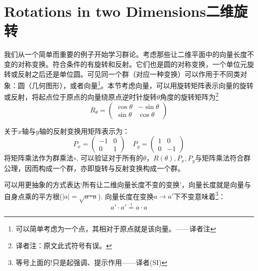 \section[二维旋转]{Rotations in two Dimensions\quad 二维旋转}
\label{sec3.2}
我们从一个简单而重要的例子开始学习群论。考虑那些让二维平面中的向量长度不变的对称变换。符合条件的有旋转和反射。它们也是圆的对称变换，一个单位元旋转或反射之后还是单位圆。可见同一个群（对应一种变换）可以作用于不同类对象：圆（几何图形），或者向量\footnote{可以简单考虑为一个点，其相对于原点就是该向量。——译者注}。本节考虑向量，可以用旋转矩阵表示向量的旋转或反射，将起点位于原点的向量绕原点逆时针旋转$\theta$角度的旋转矩阵为\footnote{译者注：原文此式符号有误。}
\begin{equation}
\label{equ3.3}
R_\theta =
	\begin{pmatrix}
		\cos \theta & -\sin \theta \\
		\sin \theta & \cos \theta
	\end{pmatrix}
\end{equation}

关于$x$轴与$y$轴的反射变换用矩阵表示为：
\begin{equation}
\label{equ3.4}
P_x = 	\begin{pmatrix}
			-1 & 0 \\ 0 & 1
		\end{pmatrix}
\quad
P_y = 	\begin{pmatrix}
			1 & 0 \\ 0 & -1
		\end{pmatrix}
\end{equation}
将矩阵乘法作为群乘法$\circ$, 可以验证对于所有的$\theta$，$R(\theta), P_x, P_y$与矩阵乘法符合群公理，因而构成一个群，亦即旋转与反射变换构成一个群。

可以用更抽象的方式表达‘所有让二维向量长度不变的变换’，向量长度就是向量与自身点乘的平方根($|a| = \sqrt{a \cdot a}$). 向量长度在变换$a \rightarrow a'$下不变意味着\footnote{等号上面的!只是起强调、提示作用——译者(SI)}：
\begin{equation}
\label{equ3.5}
a' \cdot a' \stackrel{!}{=} a \cdot a
\end{equation}

